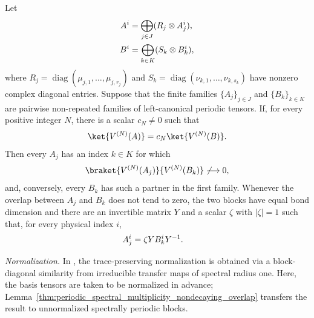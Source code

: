 \begin{lemma}
    \label{thm:periodic_multiplicity_nondecaying_overlap}
    \leanok
    Let
    \begin{align}
        A^i & =\bigoplus_{j\in J}(R_j\otimes A_j^i),
        \notag                                       \\
        B^i & =\bigoplus_{k\in K}(S_k\otimes B_k^i),
        \notag
    \end{align}
    where $R_j=\operatorname{diag}(\mu_{j,1},\ldots,\mu_{j,r_j})$ and
    $S_k=\operatorname{diag}(\nu_{k,1},\ldots,\nu_{k,s_k})$ have nonzero
    complex diagonal entries.  Suppose that the finite families
    $\{A_j\}_{j\in J}$ and $\{B_k\}_{k\in K}$ are pairwise non-repeated
    families of left-canonical periodic tensors.  If, for every positive
    integer $N$, there is a scalar $c_N\ne0$ such that
    \begin{align}
        \ket{V^{(N)}(A)}=c_N\ket{V^{(N)}(B)}.
        \notag
    \end{align}
    Then every $A_j$ has an index $k\in K$ for which
    \begin{align}
        \braket{V^{(N)}(A_j)}{V^{(N)}(B_k)}
        \not\longrightarrow 0,
        \notag
    \end{align}
    and, conversely, every $B_k$ has such a partner in the first family.
    Whenever the overlap between $A_j$ and $B_k$ does not tend to
    zero, the two blocks have equal bond dimension and there are an invertible
    matrix $Y$ and a scalar $\zeta$ with $|\zeta|=1$ such that, for every
    physical index $i$,
    \begin{align}
        A_j^i & =\zeta YB_k^iY^{-1}.
        \notag
    \end{align}

    \emph{Normalization.} In \cite[lines~313--332]{DeLasCuevas2017Irreducible},
    the trace-preserving normalization is obtained via a block-diagonal
    similarity from irreducible transfer maps of spectral radius one. Here,
    the basis tensors are taken to be normalized in advance;
    Lemma~\ref{thm:periodic_spectral_multiplicity_nondecaying_overlap} transfers
    the result to unnormalized spectrally periodic blocks.
\end{lemma}
